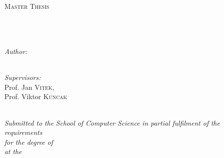 \documentclass[
11pt, %
english, %
singlespacing, %
]{MastersDoctoralThesis} %
\author{Adrien \textsc{Ghosn}} %
\begin{document}
\frontmatter %

\pagestyle{plain} %


\begin{titlepage}
\begin{center}

\textsc{\LARGE \univname}\\[1.5cm] %
\textsc{\Large Master Thesis}\\[0.5cm] %

\HRule \\[0.4cm] %
{\huge \bfseries \ttitle}\\[0.4cm] %
\HRule \\[1.5cm] %
 
\begin{minipage}{0.4\textwidth}
\begin{flushleft} \large
\emph{Author:}\\
\authorname \\
\hfill
\end{flushleft}
\end{minipage}
\begin{minipage}{0.4\textwidth}
\begin{flushright} \large
\emph{Supervisors:} \\
Prof. Jan \textsc{Vitek}, \\
Prof. Viktor \textsc{Kuncak}
\end{flushright}
\end{minipage}\\[3cm]
 
\large \textit{Submitted to the School of Computer Science in partial fulfilment of the requirements\\ for the degree of \degreename}\\ %
\textit{at the}\\[0.4cm]
\univname\\[2cm] %
 

\end{center}
\end{titlepage}
\end{document}
